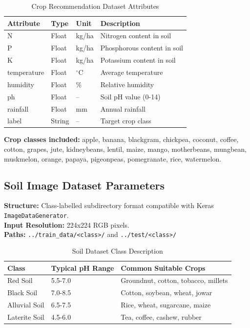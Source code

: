 \documentclass[12pt,a4paper]{report}
\begin{document}
\begin{table}[H]
\caption{Crop Recommendation Dataset Attributes}
\centering
\begin{tabularx}{\textwidth}{|l|l|l|X|}
\hline
\textbf{Attribute} & \textbf{Type} & \textbf{Unit} & \textbf{Description} \\ \hline
N & Float & kg/ha & Nitrogen content in soil \\ \hline
P & Float & kg/ha & Phosphorous content in soil \\ \hline
K & Float & kg/ha & Potassium content in soil \\ \hline
temperature & Float & $^\circ$C & Average temperature \\ \hline
humidity & Float & \% & Relative humidity \\ \hline
ph & Float & -- & Soil pH value (0-14) \\ \hline
rainfall & Float & mm & Annual rainfall \\ \hline
label & String & -- & Target crop class \\ \hline
\end{tabularx}
\end{table}

\textbf{Crop classes included:} apple, banana, blackgram, chickpea, coconut, coffee, cotton, grapes, jute, kidneybeans, lentil, maize, mango, motherbeans, mungbean, muskmelon, orange, papaya, pigeonpeas, pomegranate, rice, watermelon.

\subsection{Soil Image Dataset Parameters}
\textbf{Structure:} Class-labelled subdirectory format compatible with Keras \texttt{ImageDataGenerator}. \\
\textbf{Input Resolution:} 224x224 RGB pixels. \\
\textbf{Paths:} \texttt{../train\_data/<class>/} and \texttt{../test/<class>/}

\begin{table}[H]
\caption{Soil Dataset Class Description}
\centering
\begin{tabularx}{\textwidth}{|l|l|X|}
\hline
\textbf{Class} & \textbf{Typical pH Range} & \textbf{Common Suitable Crops} \\ \hline
Red Soil & 5.5-7.0 & Groundnut, cotton, tobacco, millets \\ \hline
Black Soil & 7.0-8.5 & Cotton, soybean, wheat, jowar \\ \hline
Alluvial Soil & 6.5-7.5 & Rice, wheat, sugarcane, maize \\ \hline
Laterite Soil & 4.5-6.0 & Tea, coffee, cashew, rubber \\ \hline
\end{tabularx}
\end{table}
\end{document}
